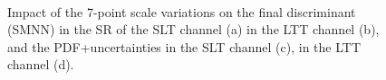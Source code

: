 \begin{figure}[htbp]
  \centering

  \\
  \caption{Impact of the 7-point scale variations on the final
    discriminant (SMNN) in the SR of the \lephad SLT channel (a) in the LTT channel (b), 
    and the PDF+\alphas uncertainties in the SLT channel (c), in the LTT channel (d).}
  \label{fig:lephad_vbf_scale_pdf}
\end{figure}



